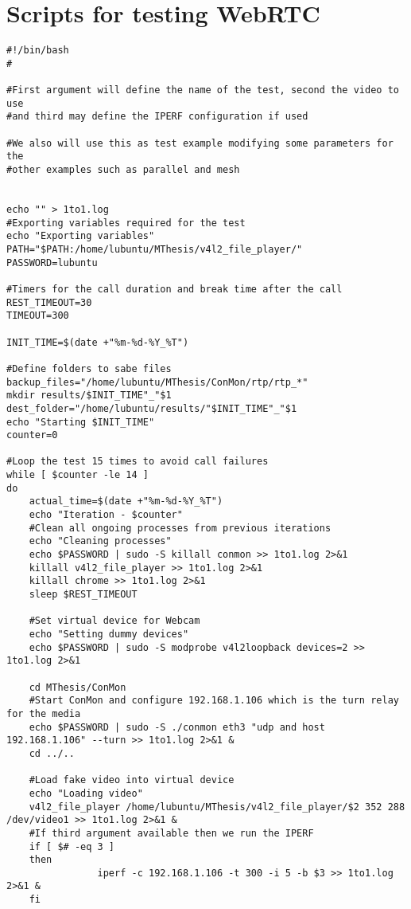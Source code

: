 \section{Scripts for testing WebRTC}
\label{sec:scriptsWebRTC}

\thispagestyle{empty}


\lstset{language=bash}
\begin{lstlisting}[caption=Script for testing WebRTC with 15 iterations]
#!/bin/bash
#

#First argument will define the name of the test, second the video to use
#and third may define the IPERF configuration if used

#We also will use this as test example modifying some parameters for the
#other examples such as parallel and mesh


echo "" > 1to1.log
#Exporting variables required for the test
echo "Exporting variables"
PATH="$PATH:/home/lubuntu/MThesis/v4l2_file_player/"
PASSWORD=lubuntu

#Timers for the call duration and break time after the call
REST_TIMEOUT=30
TIMEOUT=300

INIT_TIME=$(date +"%m-%d-%Y_%T")

#Define folders to sabe files
backup_files="/home/lubuntu/MThesis/ConMon/rtp/rtp_*"
mkdir results/$INIT_TIME"_"$1
dest_folder="/home/lubuntu/results/"$INIT_TIME"_"$1
echo "Starting $INIT_TIME"
counter=0

#Loop the test 15 times to avoid call failures
while [ $counter -le 14 ]
do
	actual_time=$(date +"%m-%d-%Y_%T")
	echo "Iteration - $counter"
 	#Clean all ongoing processes from previous iterations
 	echo "Cleaning processes"
 	echo $PASSWORD | sudo -S killall conmon >> 1to1.log 2>&1
 	killall v4l2_file_player >> 1to1.log 2>&1
 	killall chrome >> 1to1.log 2>&1
	sleep $REST_TIMEOUT
 
 	#Set virtual device for Webcam
 	echo "Setting dummy devices"
 	echo $PASSWORD | sudo -S modprobe v4l2loopback devices=2 >> 1to1.log 2>&1

 	cd MThesis/ConMon
 	#Start ConMon and configure 192.168.1.106 which is the turn relay for the media
 	echo $PASSWORD | sudo -S ./conmon eth3 "udp and host 192.168.1.106" --turn >> 1to1.log 2>&1 &
 	cd ../..

 	#Load fake video into virtual device
 	echo "Loading video"
 	v4l2_file_player /home/lubuntu/MThesis/v4l2_file_player/$2 352 288 /dev/video1 >> 1to1.log 2>&1 &
 	#If third argument available then we run the IPERF
 	if [ $# -eq 3 ]
 	then 
        		iperf -c 192.168.1.106 -t 300 -i 5 -b $3 >> 1to1.log 2>&1 &
 	fi
 

\end{lstlisting}
